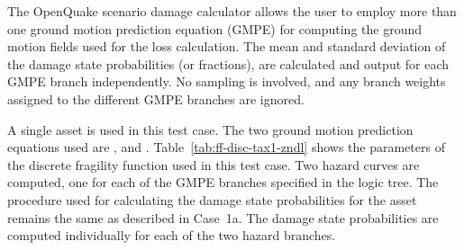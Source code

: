 The OpenQuake scenario damage calculator allows the user to employ more than one ground motion prediction equation (GMPE) for computing the ground motion fields used for the loss calculation. The mean and standard deviation of the damage state probabilities (or fractions), are calculated and output for each GMPE branch independently. No sampling is involved, and any branch weights assigned to the different GMPE branches are ignored.

A single asset is used in this test case. The two ground motion prediction equations used are \citet{boore2008}, and \citet{chiou2008}. Table~\ref{tab:ff-disc-tax1-zndl} shows the parameters of the discrete fragility function used in this test case. Two hazard curves are computed, one for each of the GMPE branches specified in the logic tree. The procedure used for calculating the damage state probabilities for the asset remains the same as described in Case~1a. The damage state probabilities are computed individually for each of the two hazard branches.